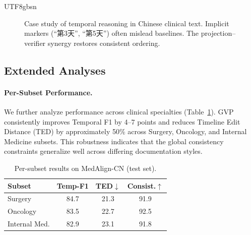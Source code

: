 \documentclass[11pt]{article}
\begin{document}
\begin{CJK*}{UTF8}{gbsn}
\begin{figure}[t]
\centering
{}
\caption{Case study of temporal reasoning in Chinese clinical text. Implicit markers (“第3天”, “第5天”) often mislead baselines. The projection–verifier synergy restores consistent ordering.}
\label{fig:case}
\vspace{-0.5em}
\end{figure}

\subsection{Extended Analyses}
\label{sec:extended_analysis}

\paragraph{Per-Subset Performance.}
We further analyze performance across clinical specialties (Table~\ref{tab:subset}). \textsc{GVP} consistently improves Temporal F1 by 4–7 points and reduces Timeline Edit Distance (TED) by approximately 50\% across Surgery, Oncology, and Internal Medicine subsets. This robustness indicates that the global consistency constraints generalize well across differing documentation styles.

\begin{table}[h]
\centering
\caption{Per-subset results on MedAlign-CN (test set).}
\label{tab:subset}
\begin{tabular}{lccc}
\toprule
Subset & Temp-F1 & TED$\downarrow$ & Consist.$\uparrow$ \\
\midrule
Surgery        & 84.7 & 21.3 & 91.9 \\
Oncology       & 83.5 & 22.7 & 92.5 \\
Internal Med.  & 82.9 & 23.1 & 91.8 \\
\bottomrule
\end{tabular}
\end{table}


\end{CJK*}
\end{document}
